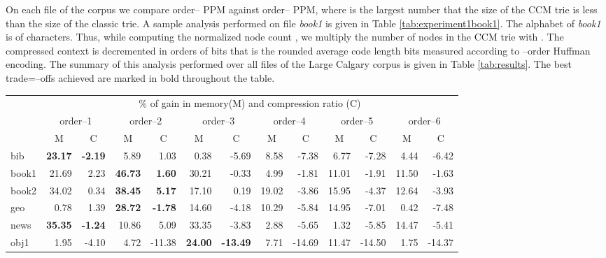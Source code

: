 \documentclass[runningheads,a4paper]{llncs}
\begin{document}
On each file of the corpus we compare order-- PPM against order-- PPM, where  is the largest number
that the size of the CCM trie is less than the size of the classic trie. 
A sample analysis performed on file \emph{book1} is given in Table \ref{tab:experiment1book1}. 
The alphabet  of \emph{book1} is of  characters. Thus, while computing the normalized node count
, we multiply the number of nodes in the CCM trie with . The compressed
context is decremented in orders of  bits that is the rounded average code length  bits measured
according to --order Huffman encoding. The summary of this analysis performed over all files of the Large
Calgary
corpus is given in Table \ref{tab:results}. The best trade=--offs achieved are marked in bold throughout the table.

\renewcommand{\arraystretch}{1.3}
\begin{table}
\small{
\begin{tabular}{l|rr|rr|rr|rr|rr|rr|}
\multicolumn{1}{c}{} & \multicolumn{12}{c}{\% of gain in memory(M) and compression ratio (C)} \\
\multicolumn{1}{c}{} & \multicolumn{2}{c}{order--1} & \multicolumn{2}{c}{order--2} & \multicolumn{2}{c}{order--3} &
               \multicolumn{2}{c}{order--4} & \multicolumn{2}{c}{order--5} & \multicolumn{2}{c}{order--6} \\ 
\multicolumn{1}{c}{} & \multicolumn{1}{c}{M} & \multicolumn{1}{c}{C} &
\multicolumn{1}{c}{M} & \multicolumn{1}{c}{C} & \multicolumn{1}{c}{M} & \multicolumn{1}{c}{C} & \multicolumn{1}{c}{M} &
\multicolumn{1}{c}{C} & \multicolumn{1}{c}{M} & \multicolumn{1}{c}{C} & \multicolumn{1}{c}{M} & \multicolumn{1}{c}{C}\\
\hline
bib & \textbf{23.17} & \textbf{-2.19} & 5.89 & 1.03 & 0.38 & -5.69 & 8.58 & -7.38 & 6.77 & -7.28 & 4.44 & -6.42 \\
\hline
book1 & 21.69 & 2.23 & \textbf{46.73} & \textbf{1.60} & 30.21 & -0.33 & 4.99 & -1.81 & 11.01 & -1.91 & 11.50 & -1.63 \\
\hline
book2 & 34.02 & 0.34 & \textbf{38.45} & \textbf{5.17} & 17.10 & 0.19 & 19.02 & -3.86 & 15.95 & -4.37 & 12.64 & -3.93 \\
\hline
geo & 0.78 & 1.39 & \textbf{28.72} & \textbf{-1.78} & 14.60 & -4.18 & 10.29 & -5.84 & 14.95 & -7.01 & 0.42 & -7.48 \\
\hline
news & \textbf{35.35} & \textbf{-1.24} & 10.86 & 5.09 & 33.35 & -3.83 & 2.88 & -5.65 & 1.32 & -5.85 & 14.47 & -5.41 \\
\hline
obj1 & 1.95 & -4.10 & 4.72 & -11.38 & \textbf{24.00} & \textbf{-13.49} & 7.71 & -14.69 & 11.47 & -14.50 & 1.75 & -14.37

\end{tabular}}
\end{table}
\end{document}

